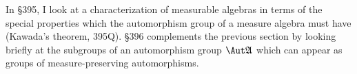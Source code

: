 In \S395, I look at a characterization  
of measurable algebras in terms of the special properties 
which the automorphism group of a measure algebra must have (Kawada's 
theorem, 395Q).   \S396 complements the previous section by looking 
briefly at the subgroups of an automorphism group $\Aut\frak A$ which 
can appear as groups of measure-preserving automorphisms. 
 
\discrpage 
 

